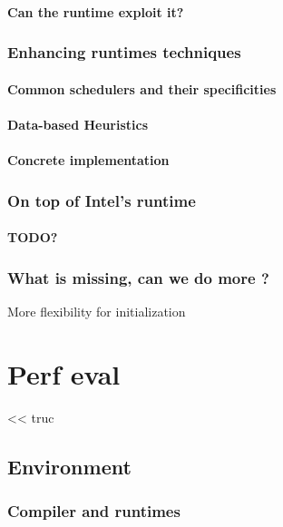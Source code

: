 \subsection{Can the runtime exploit it?}

\section{Enhancing runtimes techniques}
\subsection{Common schedulers and their specificities}
\subsection{Data-based Heuristics}
\subsection{Concrete implementation}

\section{On top of Intel's runtime}
\subsection{TODO?}

\section{What is missing, can we do more ?}
More flexibility for initialization


\part{Perf eval}

\begin{savequote}[6cm]
<< truc
\end{savequote}


\chapter{Environment}\label{chap:exp:env}
\chaptertoc

\section{Compiler and runtimes}

